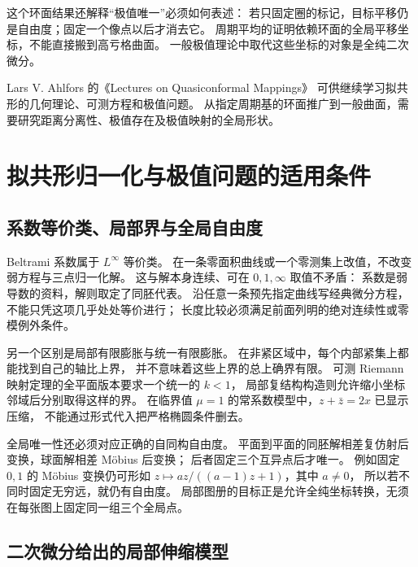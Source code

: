 这个环面结果还解释“极值唯一”必须如何表述：
若只固定圈的标记，目标平移仍是自由度；固定一个像点以后才消去它。
周期平均的证明依赖环面的全局平移坐标，不能直接搬到高亏格曲面。
一般极值理论中取代这些坐标的对象是全纯二次微分。

\ProseParagraphBreak

Lars V. Ahlfors 的《Lectures on Quasiconformal Mappings》%
\cite{Ahlfors2006Lectures}可供继续学习拟共形的几何理论、可测方程和极值问题。
从指定周期基的环面推广到一般曲面，需要研究距离分离性、极值存在及极值映射的全局形状。

\section{拟共形归一化与极值问题的适用条件}
\label{b3:sec:B06}

\subsection{系数等价类、局部界与全局自由度}
\label{b3:subsec:B0601}

Beltrami 系数属于 \(L^\infty\) 等价类。
在一条零面积曲线或一个零测集上改值，不改变弱方程与三点归一化解。
这与解本身连续、可在 \(0,1,\infty\) 取值不矛盾：
系数是弱导数的资料，解则取定了同胚代表。
沿任意一条预先指定曲线写经典微分方程，不能只凭这项几乎处处等价进行；
长度比较必须满足前面列明的绝对连续性或零模例外条件。

\ProseParagraphBreak

另一个区别是局部有限膨胀与统一有限膨胀。
在非紧区域中，每个内部紧集上都能找到自己的轴比上界，
并不意味着这些上界的总上确界有限。
可测 Riemann 映射定理的全平面版本要求一个统一的 \(k<1\)，
局部复结构构造则允许缩小坐标邻域后分别取得这样的界。
在临界值 \(\mu=1\) 的常系数模型中，\(z+\bar z=2x\) 已显示压缩，
不能通过形式代入把严格椭圆条件删去。

\ProseParagraphBreak

全局唯一性还必须对应正确的自同构自由度。
平面到平面的同胚解相差复仿射后变换，球面解相差 Möbius 后变换；
后者固定三个互异点后才唯一。
例如固定 \(0,1\) 的 Möbius 变换仍可形如
\(z\mapsto az/((a-1)z+1)\)，其中 \(a\ne0\)，
所以若不同时固定无穷远，就仍有自由度。
局部图册的目标正是允许全纯坐标转换，无须在每张图上固定同一组三个全局点。

\subsection{二次微分给出的局部伸缩模型}
\label{b3:subsec:B0602}

